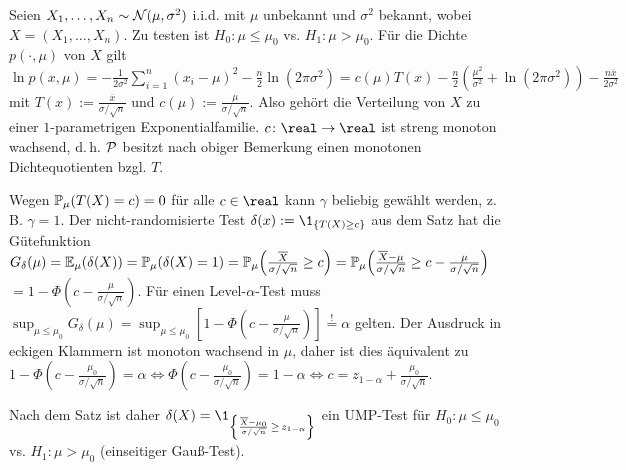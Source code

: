 \begin{Bsp}
    Seien $X_1, \dotsc, X_n \sim \N(\mu, \sigma^2)$ i.i.d. mit $\mu$ unbekannt und $\sigma^2$
    bekannt, wobei $X = (X_1, \dotsc, X_n)$.
    Zu testen ist $H_0\colon \mu \le \mu_0$ vs. $H_1\colon \mu > \mu_0$.
    Für die Dichte $p(\cdot, \mu)$ von $X$ gilt\\
    $\ln p(x, \mu) = -\frac{1}{2\sigma^2} \sum_{i=1}^n (x_i - \mu)^2 -
    \frac{n}{2} \ln(2\pi\sigma^2)
    = c(\mu) T(x) - \frac{n}{2} \left(\frac{\mu^2}{\sigma^2} +
    \ln(2\pi\sigma^2)\right) - \frac{n\overline{x}}{2\sigma^2}$\\
    mit $T(x) := \frac{\overline{x}}{\sigma/\sqrt{n}}$ und $c(\mu) := \frac{\mu}{\sigma/\sqrt{n}}$.
    Also gehört die Verteilung von $X$ zu einer $1$-parametrigen Exponentialfamilie.
    $c\colon \real \rightarrow \real$ ist streng monoton wachsend, d.\,h.
    $\P$ besitzt nach obiger Bemerkung einen monotonen Dichtequotienten bzgl. $T$.

    Wegen $\PP_\mu(T(X) = c) = 0$ für alle $c \in \real$
    kann $\gamma$ beliebig gewählt werden, z.\,B. $\gamma = 1$.
    Der nicht-randomisierte Test $\delta(x) := \1_{\{T(X) \ge c\}}$ aus dem Satz hat die
    Gütefunktion\\
    $G_\delta(\mu) = \EE_\mu(\delta(X)) = \PP_\mu(\delta(X) = 1) =
    \PP_\mu\!\left(\frac{\overline{X}}{\sigma/\sqrt{n}} \ge c\right)
    = \PP_\mu\!\left(\frac{\overline{X} - \mu}{\sigma/\sqrt{n}} \ge
    c - \frac{\mu}{\sigma/\sqrt{n}}\right)$\\
    $= 1 - \Phi\!\left(c - \frac{\mu}{\sigma/\sqrt{n}}\right)$.
    Für einen Level-$\alpha$-Test muss\\
    $\sup_{\mu \le \mu_0} G_\delta(\mu) =
    \sup_{\mu \le \mu_0} \left[1 - \Phi\!\left(c - \frac{\mu}{\sigma/\sqrt{n}}\right)\right]
    \overset{!}{=} \alpha$ gelten.
    Der Ausdruck in eckigen Klammern ist monoton wachsend in $\mu$, daher ist dies äquivalent zu\\
    $1 - \Phi\!\left(c - \frac{\mu_0}{\sigma/\sqrt{n}}\right) = \alpha
    \iff \Phi\!\left(c - \frac{\mu_0}{\sigma/\sqrt{n}}\right) = 1 - \alpha
    \iff c = z_{1-\alpha} + \frac{\mu_0}{\sigma/\sqrt{n}}$.

    Nach dem Satz ist daher
    $\delta(X) = \1_{\left\{\frac{\overline{X} - \mu_0}
    {\sigma/\sqrt{n}} \,\ge\, z_{1-\alpha}\right\}}$
    ein UMP-Test für $H_0\colon \mu \le \mu_0$ vs. $H_1\colon \mu > \mu_0$
    (einseitiger Gauß-Test).
\end{Bsp}

